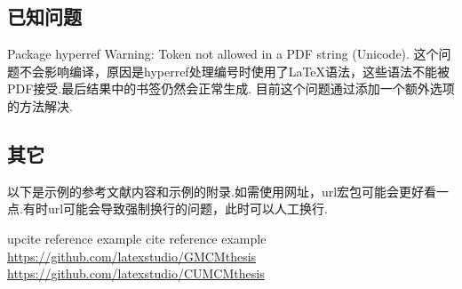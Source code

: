 \documentclass[bwprint, withouttitlepage, openfonts]{mathexpthesis}
\begin{document}
\subsection{已知问题}
Package hyperref Warning: Token not allowed in a PDF string (Unicode). 这个问题不会影响编译，原因是hyperref处理编号时使用了\LaTeX 语法，这些语法不能被PDF接受.最后结果中的书签仍然会正常生成. 目前这个问题通过添加一个额外选项的方法解决.

\subsection{其它}
以下是示例的参考文献内容和示例的附录.如需使用网址，url宏包可能会更好看一点.有时url可能会导致强制换行的问题，此时可以人工换行.

\begin{thebibliography}{99}
     upcite reference example
     cite reference example
     \url{https://github.com/latexstudio/GMCMthesis}
     \url{https://github.com/latexstudio/CUMCMthesis}
\end{thebibliography}
\end{document}
